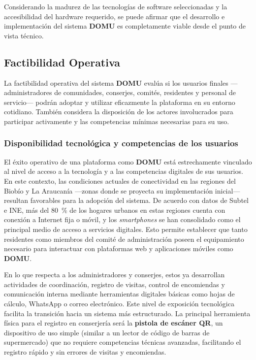 Considerando la madurez de las tecnologías de software seleccionadas y la accesibilidad del hardware requerido, se puede afirmar que el desarrollo e implementación del sistema \textbf{DOMU} es completamente viable desde el punto de vista técnico.




\subsection{Factibilidad Operativa}

La factibilidad operativa del sistema \textbf{DOMU} evalúa si los usuarios finales —administradores de comunidades, conserjes, comités, residentes y personal de servicio— podrán adoptar y utilizar eficazmente la plataforma en su entorno cotidiano. También considera la disposición de los actores involucrados para participar activamente y las competencias mínimas necesarias para su uso.

\subsubsection{Disponibilidad tecnológica y competencias de los usuarios}

El éxito operativo de una plataforma como \textbf{DOMU} está estrechamente vinculado al nivel de acceso a la tecnología y a las competencias digitales de sus usuarios. En este contexto, las condiciones actuales de conectividad en las regiones del Biobío y La Araucanía —zonas donde se proyecta su implementación inicial— resultan favorables para la adopción del sistema. De acuerdo con datos de Subtel e INE, más del 80~\% de los hogares urbanos en estas regiones cuenta con conexión a Internet fija o móvil, y los \textit{smartphones} se han consolidado como el principal medio de acceso a servicios digitales. Esto permite establecer que tanto residentes como miembros del comité de administración poseen el equipamiento necesario para interactuar con plataformas web y aplicaciones móviles como \textbf{DOMU}.

En lo que respecta a los administradores y conserjes, estos ya desarrollan actividades de coordinación, registro de visitas, control de encomiendas y comunicación interna mediante herramientas digitales básicas como hojas de cálculo, WhatsApp o correo electrónico. Este nivel de exposición tecnológica facilita la transición hacia un sistema más estructurado. La principal herramienta física para el registro en conserjería será la \textbf{pistola de escáner QR}, un dispositivo de uso simple (similar a un lector de código de barras de supermercado) que no requiere competencias técnicas avanzadas, facilitando el registro rápido y sin errores de visitas y encomiendas.

